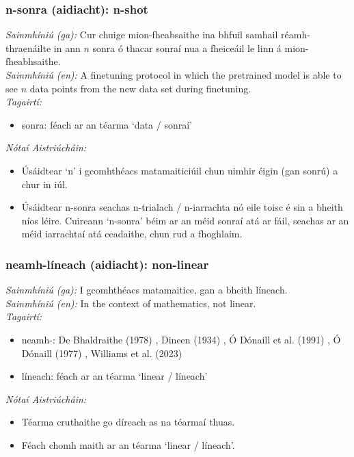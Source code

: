 \subsubsection*{n-sonra (aidiacht): n-shot}
 \noindent \textit{Sainmhíniú (ga):} Cur chuige mion-fheabsaithe ina bhfuil samhail réamh-thraenáilte in ann $n$ sonra ó thacar sonraí nua a fheiceáil le linn á mion-fheabhsaithe.
\\
 \noindent \textit{Sainmhíniú (en):} A finetuning protocol in which the pretrained model is able to see $n$ data points from the new data set during finetuning.
\\
 \noindent \textit{Tagairtí:}
\begin{itemize}
	\item sonra: féach ar an téarma `data / sonraí'
\end{itemize}

 \noindent \textit{Nótaí Aistriúcháin:}
\begin{itemize}
	\item Úsáidtear `n' i gcomhthéacs matamaiticiúil chun uimhir éigin (gan sonrú) a chur in iúl.
	\item Úsáidtear n-sonra seachas n-trialach / n-iarrachta nó eile toisc é sin a bheith níos léire. Cuireann `n-sonra' béim ar an méid sonraí atá ar fáil, seachas ar an méid iarrachtaí atá ceadaithe, chun rud a fhoghlaim.
\end{itemize}


\subsubsection*{neamh-líneach (aidiacht): non-linear}
 \noindent \textit{Sainmhíniú (ga):} I gcomhthéacs matamaitice, gan a bheith líneach.
\\
 \noindent \textit{Sainmhíniú (en):} In the context of mathematics, not linear.
\\
 \noindent \textit{Tagairtí:}
\begin{itemize}
	\item neamh-: De Bhaldraithe (1978) \cite{de-bhaldraithe}, Dineen (1934) \cite{dineen}, Ó Dónaill et al. (1991) \cite{focloir-beag}, Ó Dónaill (1977) \cite{odonaill}, Williams et al. (2023) \cite{storchiste}
	\item líneach: féach ar an téarma `linear / líneach'
\end{itemize}

 \noindent \textit{Nótaí Aistriúcháin:}
\begin{itemize}
	\item Téarma cruthaithe go díreach as na téarmaí thuas.
	\item Féach chomh maith ar an téarma `linear / líneach'.
\end{itemize}


